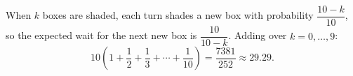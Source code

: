 When $k$ boxes are shaded, each turn shades a new box with probability $\dfrac{10-k}{10}$, so the expected wait for the next new box is $\dfrac{10}{10-k}$. Adding over $k=0,\dots,9$:
\[10\left(1+\dfrac{1}{2}+\dfrac{1}{3}+\cdots+\dfrac{1}{10}\right)=\boxed{\dfrac{7381}{252}}\approx29.29.\]
